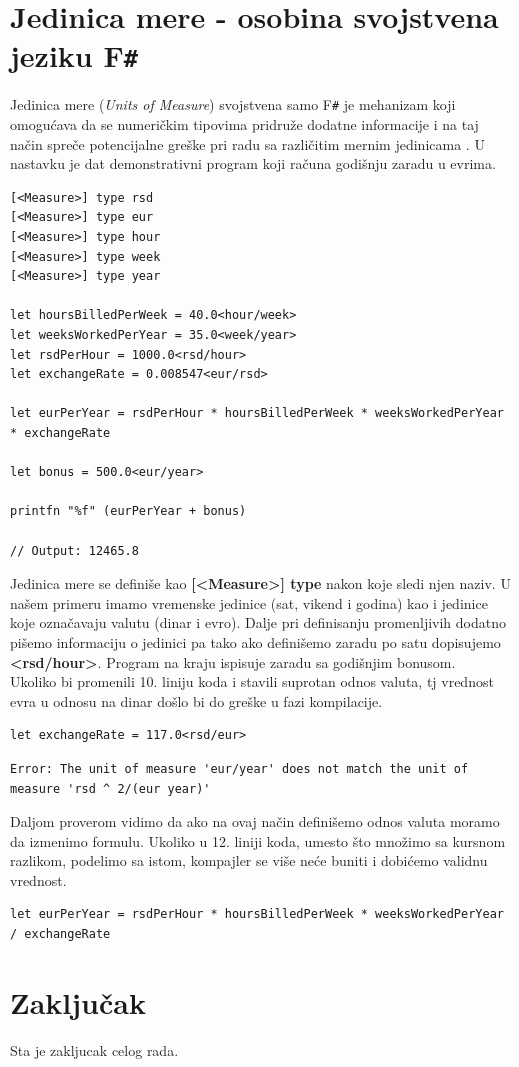 \documentclass[a4paper]{article}
\begin{document}
\section{Jedinica mere - osobina svojstvena jeziku F\texttt{\#}}
Jedinica mere (\textit{Units of Measure}) svojstvena samo F\texttt{\#} je mehanizam koji omogućava da se numeričkim tipovima pridruže dodatne informacije i na taj način spreče potencijalne greške pri radu sa različitim mernim jedinicama \cite{unitsOfMeasure}. U nastavku je dat demonstrativni program koji računa godišnju zaradu u evrima.
\begin{lstlisting}[caption={Primer jedinice mere\cite{unitsOfMeasureExample}},frame=single, label=primer]
[<Measure>] type rsd
[<Measure>] type eur
[<Measure>] type hour
[<Measure>] type week
[<Measure>] type year

let hoursBilledPerWeek = 40.0<hour/week>
let weeksWorkedPerYear = 35.0<week/year>
let rsdPerHour = 1000.0<rsd/hour>
let exchangeRate = 0.008547<eur/rsd>

let eurPerYear = rsdPerHour * hoursBilledPerWeek * weeksWorkedPerYear * exchangeRate

let bonus = 500.0<eur/year>

printfn "%f" (eurPerYear + bonus)

// Output: 12465.8

\end{lstlisting}
Jedinica mere se definiše kao \textbf{[<Measure>] type} nakon koje sledi njen naziv. U našem primeru imamo vremenske jedinice (sat, vikend i godina) kao i jedinice koje označavaju valutu (dinar i evro). Dalje pri definisanju promenljivih dodatno pišemo informaciju o jedinici pa tako ako definišemo zaradu po satu dopisujemo \textbf{<rsd/hour>}. Program na kraju ispisuje zaradu sa godišnjim bonusom. \\
Ukoliko bi promenili 10. liniju koda i stavili suprotan odnos valuta, tj vrednost evra u odnosu na dinar došlo bi do greške u fazi kompilacije. 
\begin{lstlisting}[caption={Promenjen odnos valuta},frame=single, label=primer, firstnumber=9]
let exchangeRate = 117.0<rsd/eur>
\end{lstlisting}
\begin{lstlisting}[caption={Kompajler prepoznaje grešku},frame=single, label=primer]
Error: The unit of measure 'eur/year' does not match the unit of measure 'rsd ^ 2/(eur year)'
\end{lstlisting}
Daljom proverom vidimo da ako na ovaj način definišemo odnos valuta moramo da izmenimo formulu. Ukoliko u 12. liniji koda, umesto što množimo sa kursnom razlikom, podelimo sa istom, kompajler se više neće buniti i dobićemo validnu vrednost.
\begin{lstlisting}[caption={Ispravljena linija},frame=single, label=primer, firstnumber=12]
let eurPerYear = rsdPerHour * hoursBilledPerWeek * weeksWorkedPerYear / exchangeRate
\end{lstlisting}

\section{Zaključak}
\label{sec:zakljucak}

Sta je zakljucak celog rada.

\appendix
 

\end{document}
